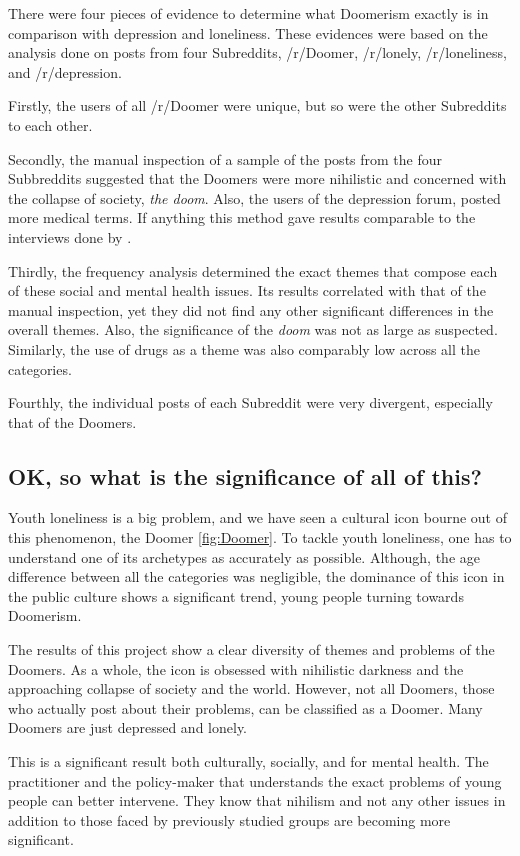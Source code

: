 \documentclass[../report.tex]{subfiles}
\begin{document}
There were four pieces of evidence to determine what Doomerism exactly is in comparison with depression and loneliness. 
These evidences were based on the analysis done on posts from four Subreddits, /r/Doomer, /r/lonely, /r/loneliness, and /r/depression.

Firstly, the users of all /r/Doomer were unique, but so were the other Subreddits to each other. 

Secondly, the manual inspection of a sample of the posts from the four Subbreddits suggested that the Doomers were more nihilistic and concerned with the collapse of society, \textit{the doom}. Also, the users of the depression forum, posted more medical terms.
If anything this method gave results comparable to the interviews done by \cite{fardghassemi_interviews}.

Thirdly, the frequency analysis determined the exact themes that compose each of these social and mental health issues.
Its results correlated with that of the manual inspection, yet they did not find any other significant differences in the overall themes. 
Also, the significance of the \textit{doom} was not as large as suspected.
Similarly, the use of drugs as a theme was also comparably low across all the categories. 

Fourthly, the individual posts of each Subreddit were very divergent, especially that of the Doomers.

\subsection{OK, so what is the significance of all of this?}
Youth loneliness is a big problem, and we have seen a cultural icon bourne out of this phenomenon, the Doomer \ref{fig:Doomer}. 
To tackle youth loneliness, one has to understand one of its archetypes as accurately as possible. 
Although, the age difference between all  the categories was negligible, the dominance of this icon in the public culture shows a significant trend, young people turning towards Doomerism.

The results of this project show a clear diversity of themes and problems of the Doomers.
As a whole, the icon is obsessed with nihilistic darkness and the approaching collapse of society and the world. 
However, not all Doomers, those who actually post about their problems, can be classified as a Doomer.
Many Doomers are just depressed and lonely.

This is a significant result both culturally, socially, and for mental health. 
The practitioner and the policy-maker that understands the exact problems of young people can better intervene.
They know that nihilism and not any other issues in addition to those faced by previously studied groups are becoming more significant.
\end{document}
